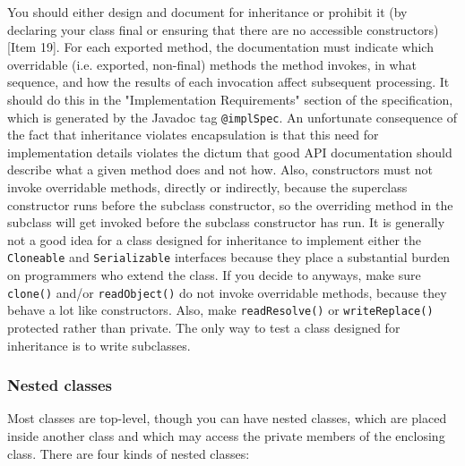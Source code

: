 \documentclass[8pt, table, xcdraw]{article}%
\begin{document}
You should either design and document for inheritance or prohibit it (by declaring your class final or ensuring that there are no accessible constructors) [Item 19]. For each exported method, the documentation must indicate which overridable (i.e. exported, non-final) methods the method invokes, in what sequence, and how the results of each invocation affect subsequent processing. It should do this in the "Implementation Requirements" section of the specification, which is generated by the Javadoc tag \lstinline{@implSpec}. An unfortunate consequence of the fact that inheritance violates encapsulation is that this need for implementation details violates the dictum that good API documentation should describe what a given method does and not how. Also, constructors must not invoke overridable methods, directly or indirectly, because the superclass constructor runs before the subclass constructor, so the overriding method in the subclass will get invoked before the subclass constructor has run. It is generally not a good idea for a class designed for inheritance to implement either the \lstinline{Cloneable} and \lstinline{Serializable} interfaces because they place a substantial burden on programmers who extend the class. If you decide to anyways, make sure \lstinline{clone()} and/or \lstinline{readObject()} do not invoke overridable methods, because they behave a lot like constructors. Also, make \lstinline{readResolve()} or \lstinline{writeReplace()} protected rather than private. The only way to test a class designed for inheritance is to write subclasses.

\subsubsection{Nested classes}

Most classes are top-level, though you can have nested classes, which are placed inside another class and which may access the private members of the enclosing class. There are four kinds of nested classes:
\end{document}
